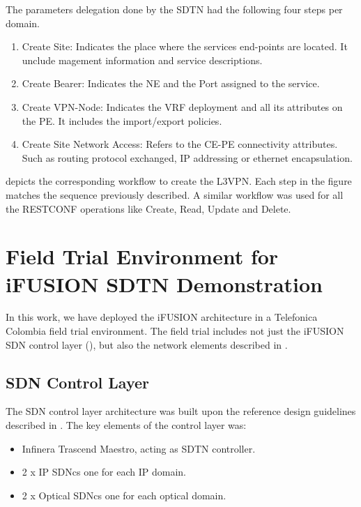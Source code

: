 \documentclass[10pt, conference]{IEEEtran}
\begin{document}
The parameters delegation done by the SDTN  had the following four steps per domain.
\begin{enumerate}
    \item Create Site: Indicates the place where the services end-points are located. It unclude magement information and service descriptions. 
    \item Create Bearer: Indicates the NE and the Port assigned to the service.
    \item Create VPN-Node: Indicates the VRF deployment and all its attributes on the PE. It includes the import/export policies.
    \item Create Site Network Access: Refers to the CE-PE connectivity attributes. Such as routing protocol exchanged, IP addressing or ethernet encapsulation. 
\end{enumerate}

 depicts the corresponding workflow to create the L3VPN. Each step in the figure matches the sequence previously described. A similar workflow was used for all the RESTCONF operations like Create, Read, Update and Delete. 

\section{Field Trial Environment for i\uppercase{FUSION} SDTN Demonstration}
\label{section:trial}

In this work, we have deployed the i\uppercase{Fusion} architecture in a Telefonica Colombia field trial environment. The field trial includes not just the i\uppercase{FUSION} SDN control layer (), but also the network elements described in .

\subsection{SDN Control Layer}
\label{sec:contollay}
The SDN control layer architecture was built upon the reference design guidelines described in . The key elements of the control layer was:
\begin{itemize}
    \item Infinera Trascend Maestro, acting as SDTN controller.
    \item 2 x IP SDNcs one for each IP domain. 
    \item 2 x Optical SDNcs one for each optical domain.
\end{itemize}
\end{document}

